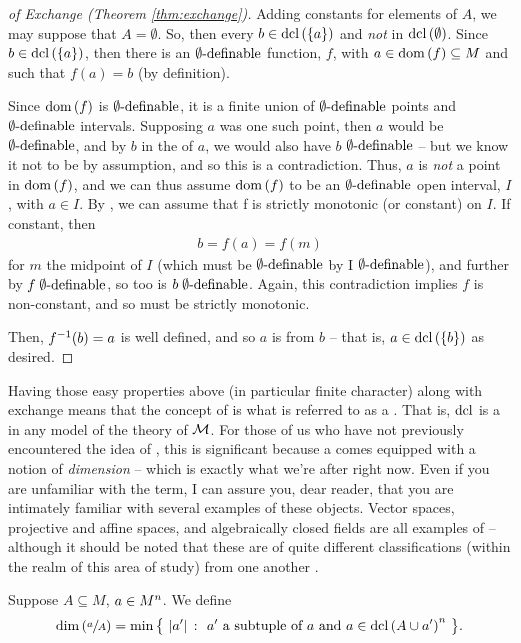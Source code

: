 \begin{proof}[of Exchange (Theorem \ref{thm:exchange})]
  Adding constants for elements of $A$, we may suppose that $A = \emptyset$. So, then every $b \in \dcl{\{a\}}$ and \emph{not} in $\dcl{\emptyset}$. Since $b \in \dcl{\{a\}}$, then there is an $\esdefnb$ function, $f$, with $a \in \dom{f} \subseteq M$ and such that $f(a) = b$ (by definition).

  Since $\dom{f}$ is $\esdefnb$, it is a finite union of $\esdefnb$ points and $\esdefnb$ intervals. Supposing $a$ was one such point, then $a$ would be $\esdefnb$, and by $b$ in the  of $a$, we would also have $b$ $\esdefnb$ -- but we know it not to be by assumption, and so this is a contradiction. Thus, $a$ is \emph{not} a point in $\dom{f}$, and we can thus assume $\dom{f}$ to be an $\esdefnb$ open interval, $I$, with $a \in I$. By \Mt, we can assume that f is strictly monotonic (or constant) on $I$. If constant, then
    \begin{align*}
      b = f(a) = f(m)
    \end{align*}
  for $m$ the midpoint of $I$ (which must be $\esdefnb$ by I $\esdefnb$), and further by $f \esdefnb$, so too is $b \esdefnb$. Again, this contradiction implies $f$ is non-constant, and so must be strictly monotonic.

  Then, $\inv{f}(b) = a$ is well defined, and so $a$ is  from $b$ -- that is, $a \in \dcl{\{b\}}$ as desired.
  \smartqed
\end{proof}

Having those easy properties above (in particular finite character) along with exchange means that the concept of  is what is referred to as a \emph{\pregeom}. That is, $\dclop$ is a \pregeom in any model of the theory of $\M$. For those of us who have not previously encountered the idea of \pregeoms, this is significant because a \pregeom comes equipped with a notion of \emph{dimension} -- which is exactly what we're after right now. Even if you are unfamiliar with the term, I can assure you, dear reader, that you are intimately familiar with several examples of these objects. Vector spaces, projective and affine spaces, and algebraically closed fields are all examples of \pregeoms -- although it should be noted that these are of quite different classifications (within the realm of this area of study) from one another \cite{pillay_geometric_1996}.

Suppose $A \subseteq M$, $\aMn[a]{n}$. We define
  \begin{align*}
    \dim{\sfrac{a}{A}} = \min{ \left\{ \ \card{\pri{a}} \ \colon \ \pri{a} \textrm{ a subtuple of } a \textrm{ and } a \in \dcl{A \cup \pri{a}}^n \ \right\} }.
  \end{align*}

